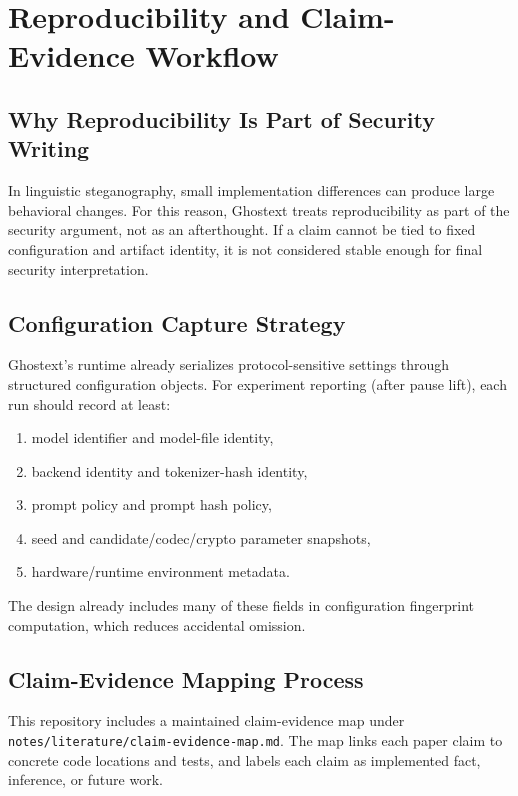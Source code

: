 \section{Reproducibility and Claim-Evidence Workflow}

\subsection{Why Reproducibility Is Part of Security Writing}

In linguistic steganography, small implementation differences can produce large behavioral changes. For this reason, Ghostext treats reproducibility as part of the security argument, not as an afterthought. If a claim cannot be tied to fixed configuration and artifact identity, it is not considered stable enough for final security interpretation.

\subsection{Configuration Capture Strategy}

Ghostext's runtime already serializes protocol-sensitive settings through structured configuration objects. For experiment reporting (after pause lift), each run should record at least:

\begin{enumerate}
\item model identifier and model-file identity,
\item backend identity and tokenizer-hash identity,
\item prompt policy and prompt hash policy,
\item seed and candidate/codec/crypto parameter snapshots,
\item hardware/runtime environment metadata.
\end{enumerate}

The design already includes many of these fields in configuration fingerprint computation, which reduces accidental omission.

\subsection{Claim-Evidence Mapping Process}

This repository includes a maintained claim-evidence map under \texttt{notes/literature/claim-evidence-map.md}. The map links each paper claim to concrete code locations and tests, and labels each claim as implemented fact, inference, or future work.

